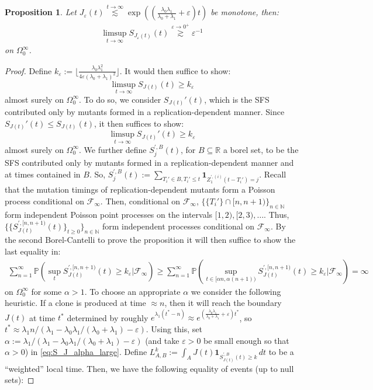 \documentclass{article}
\numberwithin{equation}{section}
\newtheorem{proposition}{Proposition}
\newcommand{\gsimas}[2]{\overset{{#1}\to {#2}}{\gtrsim}}
\newcommand{\lsimas}[2]{\overset{{#1}\to {#2}}{\lesssim}}
\begin{document}
\begin{proposition}\label{prop:limsup_theta}
   Let $J_\varepsilon(t)\lsimas{t}{\infty}\exp\left(\left(\frac{\lambda_0\lambda_1}{\lambda_0+\lambda_1}+\varepsilon\right)t\right)$ be monotone, then:
    \begin{align*}
        \limsup_{t\to\infty} S_{J_\varepsilon(t)}(t)\gsimas{\varepsilon}{0^+}\varepsilon^{-1}
    \end{align*}
    on $\Omega_0^\infty$.
\end{proposition}
\begin{proof}
  Define $k_\varepsilon:=\lfloor \frac{\lambda_0\lambda_1^2}{4\varepsilon(\lambda_0+\lambda_1)^2}\rfloor $. It would then suffice to show:
  \[\limsup_{t\to\infty}S_{J(t)}(t)\geq k_\varepsilon\]
  almost surely on $\Omega_0^\infty$. To do so, we consider $S_{J(t)}'(t)$, which is the SFS contributed only by mutants formed in a replication-dependent manner. Since $S_{J(t)}'(t)\leq S_{J(t)}(t)$, it then suffices to show:
  \[\limsup_{t\to\infty}S_{J(t)}'(t)\geq k_\varepsilon\]
  almost surely on $\Omega_0^\infty$. We further define $S_j^{',B}(t)$, for $B\subseteq \mathbb{R}$ a borel set, to be the SFS contributed only by mutants formed in a replication-dependent manner and at times contained in $B$. So, $S_{j}^{',B}(t):=\sum_{T_i'\in B,T_i'\leq t}\mathbf{1}_{Z_1^{',(i)}(t-T_i')=j}$. Recall that the mutation timings of replication-dependent mutants form a Poisson process conditional on $\mathcal{F}_\infty$. Then, conditional on $\mathcal{F}_\infty$, $\{\{T_i'\}\cap [n,n+1)\}_{n\in\mathbb{N}}$ form independent Poisson point processes on the intervals $[1,2),[2,3),\dots$. Thus, $\{\{S_{J(t)}^{',[n,n+1)}(t)\}_{t\geq 0}\}_{n\in\mathbb{N}}$ form independent processes conditional on $\mathcal{F}_\infty$. By the second Borel-Cantelli to prove the proposition it will then suffice to show the last equality in:
  \begin{align}
    \sum_{n=1}^\infty \mathbb{P}(\sup_{t}S_{J(t)}^{',[n,n+1)}(t)\geq k_\varepsilon|\mathcal{F}_\infty)\geq \sum_{n=1}^\infty \mathbb{P}(\sup_{t\in [\alpha n,\alpha(n+1))}S_{J(t)}^{',[n,n+1)}(t)\geq k_\varepsilon|\mathcal{F}_\infty)= \infty\label{eq:S_J_alpha_large}
  \end{align}
  on $\Omega_0^\infty$ for some $\alpha>1$. To choose an appropriate $\alpha$ we consider the following heuristic. If a clone is produced at time $\approx n$, then it will reach the boundary $J(t)$ at time $t^*$ determined by roughly $e^{\lambda_1 (t^*-n)}\approx e^{\left(\frac{\lambda_0\lambda_1}{\lambda_0+\lambda_1}+\varepsilon\right)t^*}$, so $t^*\approx \lambda_1n/\left(\lambda_1-\lambda_0\lambda_1/(\lambda_0+\lambda_1)-\varepsilon\right)$. Using this, set $\alpha:= \lambda_1/\left(\lambda_1-\lambda_0\lambda_1/(\lambda_0+\lambda_1)-\varepsilon\right)$ (and take $\varepsilon>0$ be small enough so that $\alpha>0$) in \ref{eq:S_J_alpha_large}. Define $L_{A,B}^k:=\int_{A} J(t)\mathbf{1}_{S_{J(t)}^{',B}(t)\geq k}\,dt$ to be a ``weighted'' local time. Then, we have the following equality of events (up to null sets):

\end{proof}
\end{document}
